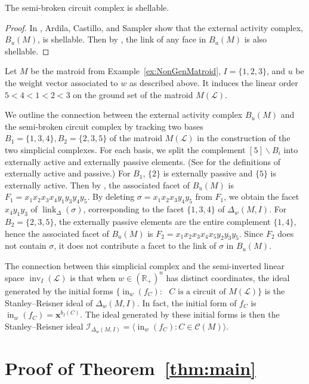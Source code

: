 \documentclass[ALCO,ThmDefs,Unicode,epreuves]{cedram}
\newcommand{\R}{\mathbb{R}}
\newcommand{\I}{\mathcal{I}}
\newcommand{\cL}{\mathcal{L}}
\newcommand{\CC}{\mathcal{C}}
\newcommand{\x}{\mathbf{x}}
\DeclareMathOperator{\In}{in}
\DeclareMathOperator{\inv}{inv}
\DeclareMathOperator{\link}{link}
\begin{document}
\begin{coro}
 The semi-broken circuit complex is shellable.
\end{coro}
\begin{proof}
In \cite{ACS16}, Ardila, Castillo, and Sampler show that the external activity complex, $B_u(M)$, is shellable. 
Then by \cite[Prop.~10.14]{BW97}, the link of any face in $B_u(M)$ is also shellable. 
\end{proof}

\begin{exam}
 Let $M$ be the matroid from Example~\ref{ex:NonGenMatroid}, $I = \{1,2,3\}$, and $u$ be
 the weight vector associated to $w$ as described above. 
 It induces the linear order $5<4<1<2<3$ on the
 ground set of the matroid $M(\cL)$.
 
 We outline the connection between the external activity complex $B_u(M)$
 and the semi-broken circuit complex by tracking two bases 
 $B_1=\{1,3,4\}, B_2=\{2,3,5\}$ of the matroid $M(\cL)$ in the
 construction of the two simplicial complexes. 
 For each basis, we split the complement $[5]\backslash B_i$ into externally
 active and externally passive elements. (See \cite[\S~2.5]{AB16} for the definitions of externally active and passive.) 
 For $B_1$, $\{2\}$ is externally
 passive and $\{5\}$ is externally active. Then by \cite[Theorem~5.1]{AB16}, the associated facet
 of $B_u(M)$ is $F_1=x_1x_2x_3x_4y_1y_3y_4y_5.$ By deleting $\sigma =
 x_1x_2x_3y_4y_5$ from $F_1$, we obtain the facet $x_4y_1y_3$ of
 $\link_{\Delta}(\sigma)$, corresponding to the facet $\{1,3,4\}$ of $\Delta_w(M,I)$. 
 For $B_2=\{2,3,5\}$, the externally
 passive elements are the entire complement $\{1,4\}$, hence the
 associated facet of $B_u(M)$ is $F_2=x_1x_2x_3x_4x_5y_2y_3y_5$. 
 Since $F_2$ does not contain $\sigma$, it does not contribute a facet to the link of $\sigma$ in $B_u(M)$.
 \end{exam}



The connection between this simplicial complex and the semi-inverted linear space $\inv_I(\cL)$ 
is that when $w \in (\R_+)^n$ has distinct coordinates, the ideal generated by the initial forms $\{ \In_w(f_C) : \text{ $C$ is a circuit of }M(\cL)\}$ 
is the Stanley--Reisner ideal of $\Delta_w(M,I)$. In fact, the initial form of $f_C$ is $\In_w(f_C) =\x^{b_I(C)}$.
The ideal generated by these initial forms is then the Stanley--Reisner ideal $\I_{\Delta_w(M,I) } = \langle \In_w(f_C):C \in \CC (M) \rangle$.


\section{Proof of Theorem~\ref{thm:main}}\label{sec:proof}
\end{document}
